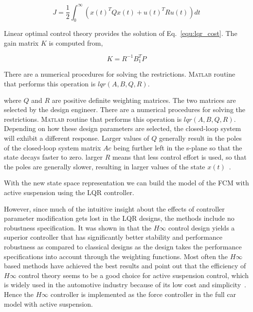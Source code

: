  \begin{equation}
 \label{equ:lqr_cost}
     J=\frac{1}{2}\int_{0}^{\infty}(x(t)^TQx(t)+u(t)^TRu(t))dt
 \end{equation}

Linear optimal control theory provides the solution of Eq.~\ref{equ:lqr_cost}.
%
The gain matrix $K$ is computed from,

\begin{equation}
    K = R^{-1}B_1^{T}P
\end{equation}
 
There are a numerical procedures for solving the restrictions. \textsc{Matlab} routine that performs this operation is $lqr (A,B,Q,R)$.
 
where $Q$ and $R$ are positive definite weighting matrices.
%
The two matrices are selected by the design engineer.
%
There are a numerical procedures for solving the restrictions. \textsc{Matlab} routine that performs this operation is $lqr (A,B,Q,R)$.
Depending on how these design parameters are selected, the closed-loop system will exhibit a different response.
%
Larger values of $Q$ generally result in the poles of the closed-loop system matrix $Ac$ being further left in the s-plane so that the state decays faster to zero.
%
larger $R$ means that less control effort is used, so that the poles are generally slower, resulting in larger values of the state $x(t)$~\cite{agharkakli2012simulation}.
 
With the new state space representation we can build the model of the \ac{FCM} with active suspension using the \ac{LQR} controller.

However, since much of the intuitive insight about the effects of controller parameter modification gets lost in the \ac{LQR} designs, the methods include no robustness specification. 
%
It was shown in \cite{doi:10.1076/vesd.39.4.279.14149} that the $H\infty$ control design yields a superior controller that has significantly better stability and performance robustness as compared to classical designs as the design takes the performance specifications into account through the weighting functions.
%
Most often the $H\infty$ based methods have achieved the best results and point out that the efficiency of $H\infty$ control theory seems to be a good choice for active suspension control, which is widely used in the automotive industry because of its low cost and simplicity~\cite{savaresi2010semi}.
%
Hence the $H\infty$ controller is implemented as the force controller in the full car model with active suspension.

